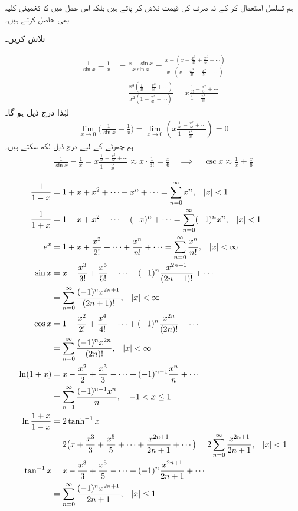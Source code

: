 ہم تسلسل استعمال کر کے نہ صرف   کی قیمت تلاش کر پاتے ہیں بلکہ اس عمل میں  کا تخمینی کلیہ بھی حاصل کرتے ہیں۔

 تلاش کریں۔

\begin{align*}
\frac{1}{\sin x}-\frac{1}{x}&=\frac{x-\sin x}{x\sin x}=\frac{x-(x-\tfrac{x^3}{3!}+\tfrac{x^5}{5!}-\cdots)}{x\cdot(x-\tfrac{x^3}{3!}+\tfrac{x^5}{5!}-\cdots)}\\
&=\frac{x^3(\tfrac{1}{3!}-\tfrac{x^2}{5!}+\cdots)}{x^2(1-\tfrac{x^2}{3!}+\cdots)}=x\frac{\frac{1}{3!}-\frac{x^2}{5!}+\cdots}{1-\frac{x^2}{3!}+\cdots}
\end{align*}
لہٰذا درج ذیل ہو گا۔
\begin{align*}
\lim_{x\to 0}\big(\frac{1}{\sin x}-\frac{1}{x}\big)=\lim_{x\to 0}\left(x\frac{\frac{1}{3!}-\frac{x^2}{5!}+\cdots}{1-\frac{x^2}{3!}+\cdots}\right)=0
\end{align*}
ہم چھوٹے  کے لیے  درج ذیل لکھ سکتے ہیں۔
\begin{align*}
\frac{1}{\sin x}-\frac{1}{x}=x\frac{\frac{1}{3!}-\frac{x^2}{5!}+\cdots}{1-\frac{x^2}{3!}+\cdots} \approx x\cdot \frac{1}{3!}=\frac{x}{6} \quad \implies \quad \csc x\approx \frac{1}{x}+\frac{x}{6}
\end{align*} 


\begin{align*}
\frac{1}{1-x}&=1+x+x^2+\cdots+x^n+\cdots=\sum_{n=0}^{\infty}x^n,\quad\abs{x}<1\\
\frac{1}{1+x}&=1-x+x^2-\cdots+(-x)^n+\cdots=\sum_{n=0}^{\infty}(-1)^nx^n,\quad\abs{x}<1\\
e^x&=1+x+\frac{x^2}{2!}+\cdots+\frac{x^n}{n!}+\cdots=\sum_{n=0}^{\infty}\frac{x^n}{n!},\quad\abs{x}<\infty\\
\sin x&=x-\frac{x^3}{3!}+\frac{x^5}{5!}-\cdots+(-1)^n\frac{x^{2n+1}}{(2n+1)!}+\cdots\\
&=\sum_{n=0}^{\infty}\frac{(-1)^nx^{2n+1}}{(2n+1)!},\quad\abs{x}<\infty\\
\cos x&=1-\frac{x^2}{2!}+\frac{x^4}{4!}-\cdots+(-1)^n\frac{x^{2n}}{(2n)!}+\cdots\\
&=\sum_{n=0}^{\infty}\frac{(-1)^nx^{2n}}{(2n)!},\quad\abs{x}<\infty\\
\ln(1+x)&=x-\frac{x^2}{2}+\frac{x^3}{3}-\cdots+(-1)^{n-1}\frac{x^n}{n}+\cdots\\
&=\sum_{n=1}^{\infty}\frac{(-1)^{n-1}x^n}{n},\quad-1<x\le 1\\
\ln\frac{1+x}{1-x}&=2\tanh^{-1}x\\
&=2\big(x+\frac{x^3}{3}+\frac{x^5}{5}+\cdots+\frac{x^{2n+1}}{2n+1}+\cdots\big)=2\sum_{n=0}^{\infty}\frac{x^{2n+1}}{2n+1},\quad\abs{x}<1\\
\tan^{-1}x&=x-\frac{x^3}{3}+\frac{x^5}{5}-\cdots+(-1)^n\frac{x^{2n+1}}{2n+1}+\cdots\\
&=\sum_{n=0}^{\infty}\frac{(-1)^nx^{2n+1}}{2n+1},\quad\abs{x}\le 1
\end{align*}


